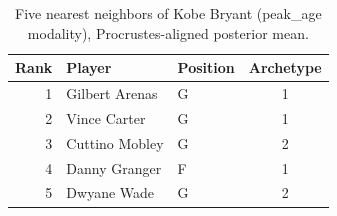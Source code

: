 \begin{table}[htbp]
  \centering\small
  \begin{tabular}{rllc}
    \toprule
    Rank & Player & Position & Archetype \\
    \midrule
    1 & Gilbert Arenas & G & 1 \\
    2 & Vince Carter & G & 1 \\
    3 & Cuttino Mobley & G & 2 \\
    4 & Danny Granger & F & 1 \\
    5 & Dwyane Wade & G & 2 \\
    \bottomrule
  \end{tabular}
  \caption{Five nearest neighbors of Kobe Bryant (peak_age modality), Procrustes-aligned posterior mean.}
  \label{tab:Kobe_Bryant_neighbors_peak_age}
\end{table}


